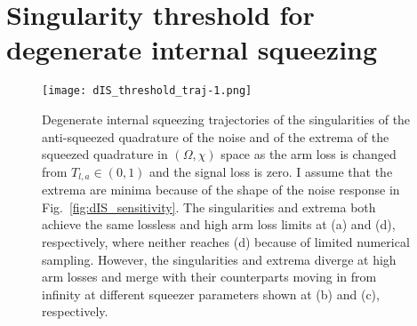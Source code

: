 
\chapter{Singularity threshold for degenerate internal squeezing}
\label{app:dIS_singularity_thr}

\begin{figure}[h!]
    \centering
    \texttt{[image: dIS\_threshold\_traj-1.png]}
    \caption{ Degenerate internal squeezing trajectories of the singularities of the anti-squeezed quadrature of the noise and of the extrema of the squeezed quadrature in $(\Omega, \chi)$ space as the arm loss is changed from $T_{l,a}\in(0,1)$ and the signal loss is zero. I assume that the extrema are minima because of the shape of the noise response in Fig.~\ref{fig:dIS_sensitivity}.
    The singularities and extrema both achieve the same lossless and high arm loss limits at (a) and (d), respectively, where neither reaches (d) because of limited numerical sampling. However, the singularities and extrema diverge at high arm losses  and merge with their counterparts moving in from infinity at different squeezer parameters shown at (b) and (c), respectively. %
    }
    \label{fig:dIS_threshold_traj} %
\end{figure}

